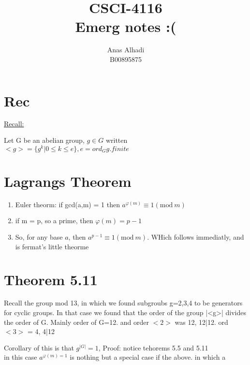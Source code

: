 \documentclass{article}
\title{\textbf{CSCI-4116\\Emerg notes :(}}
\author{Anas Alhadi\\B00895875}
\makeatletter
\newcommand*{\currentname}{\TR@currentTitle}
\numberwithin{equation}{subsection}
\makeatother
\begin{document}
	\maketitle

	\vspace{20pt}
	
	\hrulefill

	\vspace{25pt}
	\section*{Rec}
	\underline{Recall:}

	Let G be an abelian group, $g\in G$ written $<g> = \{g^k | 0 \le k \le e\}, e = ord_G g. finite$
	\vspace{25pt}
	\section*{Lagrangs Theorem}
	\begin{enumerate}
		\item Euler theorm: if gcd(a,m) = 1 then $a^{\varphi(m)} \equiv 1 (\textrm{mod}\ m)$
		\item if m = p, so a prime, then $\varphi (m) = p-1$
		\item So, for any base $a$, then $a^{p-1} \equiv 1 (\textrm{mod}\ m)$. WHich follows immediatly, and is fermat's little theorme
	\end{enumerate}

	\section*{Theorem 5.11}
	Recall the group mod 13, in which we found subgroubs g=2,3,4 to be generators for cyclic groups. In that case
	we found that the order of the group |<g>| divides the order of G. Mainly  order of G=12. and order $<2>$ was 12, 12|12. ord $<3>$ = 4, 4|12

	Corollary of this is that $g^{|G|} =1 $, Proof: notice tehorems 5.5 and 5.11\\
	in this case $a^{\varphi(m) =1}$ is nothing but a special case if the above. in which 
	\newpage
	\thispagestyle{fancy}
 a
\end{document}
